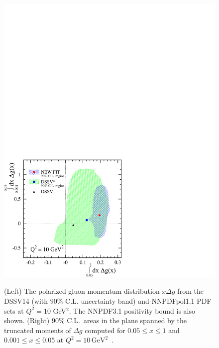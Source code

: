 \begin{figure}[!t]
\includegraphics[scale=0.555,clip=true,trim=0 0 7cm 15cm]{plots/correlation_getot.pdf}\\
\caption{\small (Left) The polarized gluon momentum distribution  
$x\Delta g$ from the DSSV14 (with $90\%$ C.L. uncertainty band)
and NNPDFpol1.1 PDF sets at $Q^2=10$ GeV$^2$. The NNPDF3.1 positivity
bound is also shown.
(Right) $90\%$ C.L.\ areas in the plane spanned by the truncated moments of
$\Delta g$ computed for $0.05\leq x\leq 1$ and $0.001\leq x\leq 0.05$ at $Q^2=10\,\mathrm{GeV}^2$~\cite{deFlorian:2014yva}.}
\label{fig:RHICpdfs}
\end{figure}

